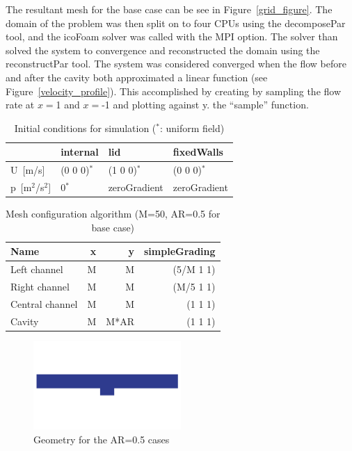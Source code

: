 \documentclass[twocolumn,10pt]{asme2ej}
\begin{document}
The resultant mesh for the base case can be see in Figure~\ref{grid_figure}. The domain of the problem was then split on to four CPUs using the decomposePar tool, and the icoFoam solver was called with the MPI option. The solver than solved the system to convergence and reconstructed the domain using the reconstructPar tool. The system was considered converged when the flow before and after the cavity both approximated a linear function (see Figure~\ref{velocity_profile}). This accomplished by creating by sampling the flow rate at $x=$1 and $x=$-1 and plotting against y. the ``sample'' function.

\begin{table}[bt]
\begin{center}
\begin{tabular}{| l | l | l | l | }
\hline
                & internal    & lid          & fixedWalls   \\
\hline
U~[m/s]         & (0 0 0)$^*$ & (1 0 0)$^*$  & (0 0 0)$^*$  \\
p~[m$^2$/s$^2$] & 0$^*$       & zeroGradient & zeroGradient \\
\hline
\end{tabular}
\caption{Initial conditions for simulation ($^*$: uniform field)}
\label{initial_conditions}
\end{center}
\end{table}

\begin{table}[bt]
\begin{center}
\begin{tabular}{| l | r r r | }
\hline
Name            & x &  y    & simpleGrading \\
\hline
Left channel    & M &  M    & (5/M 1 1) \\
Right channel   & M &  M    & (M/5 1 1) \\
Central channel & M &  M    & (1   1 1) \\
Cavity          & M &  M*AR & (1   1 1) \\
\hline
\end{tabular}
\caption{Mesh configuration algorithm (M=50, AR=0.5 for base case)}
\label{mesh_generation}
\end{center}
\end{table}

\begin{figure}[tb]
\begin{center}
\includegraphics[width=0.5\textwidth]{figure/geometry.pdf}
\caption{Geometry for the AR=0.5 cases}
\label{geometry_figure}
\end{center}
\end{figure}
\end{document}
